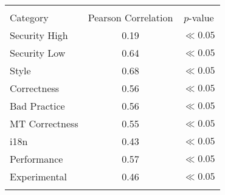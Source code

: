 
\begin{tabular}{lcc}
\hline \\
Category & Pearson Correlation & $p$-value \\ \hline 
Security High & 0.19 & $\ll 0.05$\\
Security Low & 0.64 & $\ll 0.05$\\
Style & 0.68 & $\ll 0.05$\\
Correctness & 0.56 & $\ll 0.05$\\
Bad Practice & 0.56 & $\ll 0.05$\\
MT Correctness & 0.55 & $\ll 0.05$\\
i18n & 0.43 & $\ll 0.05$\\
Performance & 0.57 & $\ll 0.05$\\
Experimental & 0.46 & $\ll 0.05$\\
\hline \\
\end{tabular}
